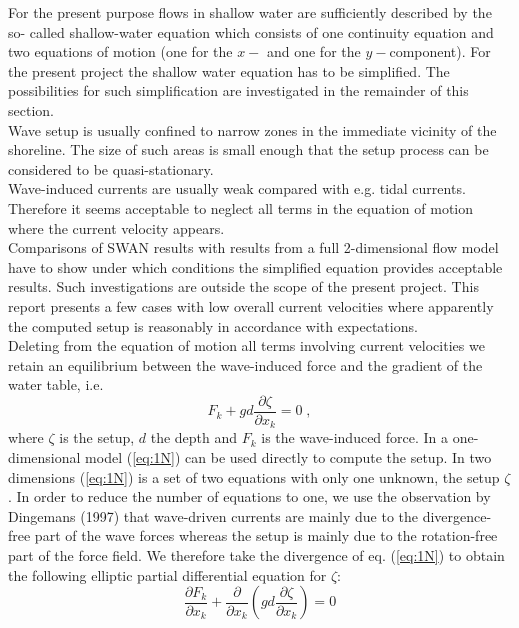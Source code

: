 \documentclass[12pt]{book}
\begin{document}
For the present purpose flows in shallow water are sufficiently described by the so-
called shallow-water equation which consists of one continuity equation and two
equations of motion (one for the $x-$ and one for the $y-$component). For the present
project the shallow water equation has to be simplified. The possibilities for such
simplification are investigated in the remainder of this section.
\\[2ex]
\noindent
Wave setup is usually confined to narrow zones in the immediate vicinity of the
shoreline. The size of such areas is small enough that the setup process can be
considered to be quasi-stationary.
\\[2ex]
\noindent
Wave-induced currents are usually weak compared with e.g. tidal currents.
Therefore it seems acceptable to neglect all terms in the equation of motion where
the current velocity appears.
\\[2ex]
\noindent
Comparisons of SWAN results with results from a full 2-dimensional flow model
have to show under which conditions the simplified equation provides acceptable
results. Such investigations are outside the scope of the present project. This report
presents a few cases with low overall current velocities where apparently the
computed setup is reasonably in accordance with expectations.
\\[2ex]
\noindent
Deleting from the equation of motion all terms involving current velocities we retain
an equilibrium between the wave-induced force and the gradient of the water table,
i.e.
\begin{equation}
F_{k} + gd \frac{\partial \zeta}{\partial x_{k}} = 0\;,
\label{eq:1N}
\end{equation}
where $\zeta$ is the setup, $d$ the depth and $F_{k}$ is the wave-induced force.
In a one-dimensional model (\ref{eq:1N}) can be used directly to compute the setup. In two
dimensions (\ref{eq:1N}) is a set of two equations with only one unknown,
the setup $\zeta$. In
order to reduce the number of equations to one, we use the observation by
Dingemans (1997) that wave-driven currents are mainly due to the
divergence-free part of the wave forces whereas the setup is mainly due to the
rotation-free part of the force field. We therefore take the divergence of eq. (\ref{eq:1N}) to
obtain the following elliptic partial differential equation for $\zeta$:
\begin{equation}
\frac{\partial F_{k}}{\partial x_{k}} + \frac{\partial}{\partial x_{k}}
(gd \frac{\partial \zeta}{\partial x_{k}}) = 0
\label{eq:2N}
\end{equation}
\end{document}
